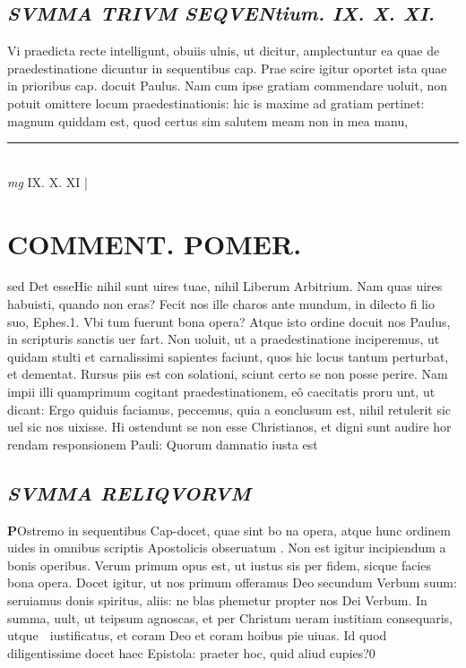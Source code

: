 \documentclass{article}
\begin{document}
\begin{pages}
\subsection*{\textit{SVMMA TRIVM SEQVENtium. IX. X. XI.  }}\pstart Vi praedicta recte intelligunt, obuiis ulnis, ut dicitur, amplectuntur ea quae de praedestinatione dicuntur in sequentibus cap. Prae scire igitur oportet ista quae in prioribus cap. docuit Paulus. Nam cum ipse gratiam commendare uoluit, non potuit omittere locum praedestinationis: hic is maxime ad gratiam pertinet: magnum quiddam est, quod certus sim salutem meam non in mea manu,  \pend
\vspace{0.5cm}\noindent
\vspace{0.2cm}\rule{1cm}{0.2pt}\\ 
\hspace{0.2cm}\textit{mg}
\footnotesize IX. X. XI 
\normalsize| 
\section*{COMMENT. POMER.  }
\pstart sed Det esseHic nihil sunt uires tuae, nihil Liberum Arbitrium. Nam quas uires habuisti, quando non eras? Fecit nos ille charos ante mundum, in dilecto fi lio suo, Ephes.1. Vbi tum fuerunt bona opera? Atque  isto ordine docuit nos Paulus, in scripturis sanctis uer fart. Non uoluit, ut a praedestinatione inciperemus, ut quidam stulti et carnalissimi sapientes faciunt, quos hic locus tantum perturbat, et dementat. Rursus piis est con solationi, sciunt certo se non posse perire. Nam impii illi quamprimum cogitant praedestinationem, eô caecitatis proru unt, ut dicant: Ergo quiduis faciamus, peccemus, quia a eonclusum est, nihil retulerit sic uel sic nos uixisse. Hi ostendunt se non esse Christianos, et digni sunt audire hor rendam responsionem Pauli: Quorum damnatio iusta est\pend
{}
{}
\subsection*{\textit{SVMMA RELIQVORVM }}\pstart \huge\textbf{P}\normalsize Ostremo in sequentibus Cap-docet, quae sint bo na opera, atque hunc ordinem uides in omnibus scriptis Apostolicis obseruatum . Non est igitur incipiendum a bonis operibus. Verum primum opus est, ut iustus sis per fidem, sicque facies bona opera. Docet igitur, ut nos primum offeramus Deo secundum Verbum suum: seruiamus donis spiritus, aliis: ne blas phemetur propter nos Dei Verbum. In summa, uult, ut teipsum agnoscas, et per Christum ueram iustitiam consequaris, utque  iustificatus, et coram Deo et coram hoibus pie uiuas. Id quod diligentissime docet haec Epistola: praeter hoc, quid aliud cupies?0  \pend
{}
{}

\end{pages}
\end{document}
